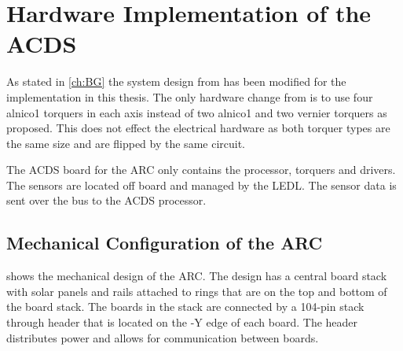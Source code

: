 
\chapter{Hardware Implementation of the \acf{ACDS}}\label{ch:CubeSatHardware}

As stated in \cref{ch:BG} the system design from \cite{Mentch11} has been modified for the implementation in this thesis. The only hardware change from \cite{Mentch11} is to use four alnico1 torquers in each axis instead of two alnico1 and two vernier torquers as proposed. This does not effect the electrical hardware as both torquer types are the same size and are flipped by the same circuit.

The \ac{ACDS} board for the \ac{ARC} only contains the processor, torquers and drivers. The sensors are located off board and managed by the \ac{LEDL}. The sensor data is sent over the bus to the \ac{ACDS} processor. 


\section{Mechanical Configuration of the \acf{ARC}}

 shows the mechanical design of the \ac{ARC}. The design has a central board stack with solar panels and rails attached to rings that are on the top and bottom of the board stack. The boards in the stack are connected by a 104-pin stack through header that is located on the -Y edge of each board. The header distributes power and allows for communication between boards. 

